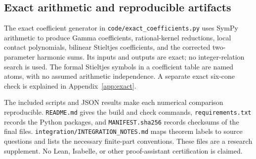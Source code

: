 \subsection{Exact arithmetic and reproducible artifacts}

The exact coefficient generator in
\nolinkurl{code/exact_coefficients.py} uses SymPy arithmetic to produce
Gamma coefficients, rational-kernel reductions, local contact
polynomials, bilinear Stieltjes coefficients, and the corrected
two-parameter harmonic sums.  Its inputs and outputs are exact; no
integer-relation search is used.  The formal Stieltjes symbols in a
coefficient table are named atoms, with no assumed arithmetic
independence.  A separate exact six-cone check is explained in
Appendix~\ref{app:exact}.

The included scripts and JSON results make each numerical comparison
reproducible.  \nolinkurl{README.md} gives the build and check commands,
\nolinkurl{requirements.txt} records the Python packages, and
\nolinkurl{MANIFEST.sha256} records checksums of the final files.
\nolinkurl{integration/INTEGRATION_NOTES.md} maps theorem labels to
source questions and lists the necessary finite-part conventions.
These files are a research supplement.  No Lean, Isabelle, or other
proof-assistant certification is claimed.
